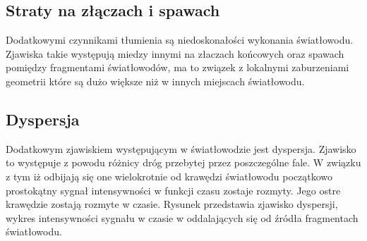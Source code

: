\documentclass[paper=a4, fontsize=11pt]{scrartcl} %
\numberwithin{equation}{section} %
\numberwithin{figure}{section} %
\numberwithin{table}{section} %
\begin{document}
\subsection{Straty na złączach i spawach}

Dodatkowymi czynnikami tłumienia są niedoskonałości wykonania światłowodu. Zjawiska takie występują miedzy innymi na złaczach końcowych oraz spawach pomiędzy
fragmentami światłowodów, ma to związek z lokalnymi zaburzeniami geometrii które są dużo większe niż w innych miejscach światłowodu.

\subsection{Dyspersja}

Dodatkowym zjawiskiem występującym w światłowodzie jest dyspersja. Zjawisko to występuje z powodu różnicy dróg przebytej przez poszczególne fale.
W związku z tym iż odbijają się one wielokrotnie od krawędzi światłowodu początkowo prostokątny sygnał intensywności w funkcji czasu zostaje rozmyty.
Jego ostre krawędzie zostają rozmyte w czasie. Rysunek przedstawia zjawisko dyspersji, wykres intensywności sygnału w czasie w oddalających się od źródła
fragmentach światłowodu.
\end{document}
